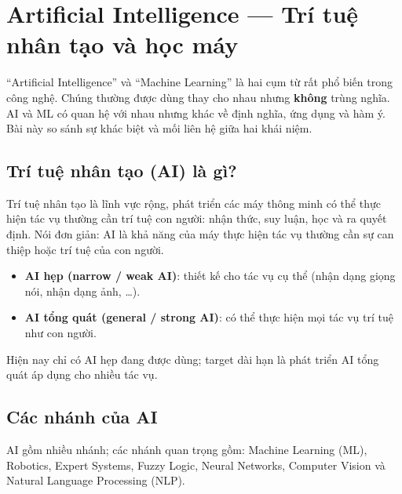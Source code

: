 \section{Artificial Intelligence --- Trí tuệ nhân tạo và học máy}

\begin{dongco}[title={AI và ML: hai từ hay bị nhầm}]
``Artificial Intelligence'' và ``Machine Learning'' là hai cụm từ rất phổ biến trong công nghệ.
Chúng thường được dùng thay cho nhau nhưng \textbf{không} trùng nghĩa.
AI và ML có quan hệ với nhau nhưng khác về định nghĩa, ứng dụng và hàm ý.
Bài này so sánh sự khác biệt và mối liên hệ giữa hai khái niệm.
\end{dongco}

\subsection{Trí tuệ nhân tạo (AI) là gì?}

\begin{dinhnghia}[title={Định nghĩa AI}]
Trí tuệ nhân tạo là lĩnh vực rộng, phát triển các máy thông minh có thể thực hiện tác vụ thường cần trí tuệ con người: nhận thức, suy luận, học và ra quyết định.
Nói đơn giản: AI là khả năng của máy thực hiện tác vụ thường cần sự can thiệp hoặc trí tuệ của con người.
\end{dinhnghia}

\begin{phuongphap}[title={Hai loại AI}]
\begin{itemize}
  \item \textbf{AI hẹp (narrow / weak AI)}: thiết kế cho tác vụ cụ thể (nhận dạng giọng nói, nhận dạng ảnh, \ldots).
  \item \textbf{AI tổng quát (general / strong AI)}: có thể thực hiện mọi tác vụ trí tuệ như con người.
\end{itemize}
Hiện nay chỉ có AI hẹp đang được dùng; target dài hạn là phát triển AI tổng quát áp dụng cho nhiều tác vụ.
\end{phuongphap}

\subsection{Các nhánh của AI}

\begin{ynghia}[title={AI như một ``giỏ'' các nhánh}]
AI gồm nhiều nhánh; các nhánh quan trọng gồm: Machine Learning (ML), Robotics, Expert Systems, Fuzzy Logic, Neural Networks, Computer Vision và Natural Language Processing (NLP).
\end{ynghia}

